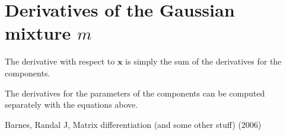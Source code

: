 \documentclass{paper}
\newcommand{\vr}[1]{\ensuremath{\boldsymbol{#1}}}
\begin{document}
\section{Derivatives of the Gaussian mixture $m$}
The derivative with respect to $\vr{x}$ is simply the sum of the derivatives for the components.

The derivatives for the parameters of the components can be computed separately with the equations above.


\begin{thebibliography}{9}%
	 Barnes, Randal J,  Matrix differentiation (and some other stuff) (2006)
\end{thebibliography}
\end{document}
